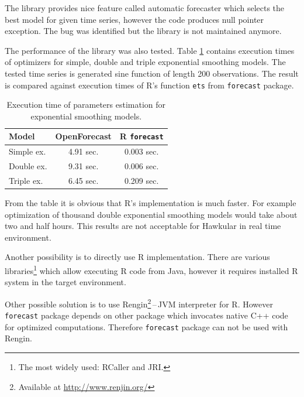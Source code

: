     The library provides nice feature called automatic forecaster which selects the best model for given
    time series, however the code produces null pointer exception. The bug was identified but the library is not
    maintained anymore.

    The performance of the library was also tested. Table \ref{tab:open-forecast-perf} contains execution times of
    optimizers for simple, double and triple exponential smoothing models. The tested time series is generated sine
    function of length 200 observations. The result is compared against execution times of R's function \texttt{ets}
    from \texttt{forecast} package.

    \begin{table}[h]
        \begin{center}
            \begin{tabular}{l|c|c}
                \textbf{Model} & \textbf{OpenForecast} & \textbf{R \texttt{forecast}} \\ \hline \hline
                Simple ex. & 4.91 sec. & 0.003 sec.\\
                Double ex. & 9.31 sec. & 0.006 sec.\\
                Triple ex. & 6.45 sec. & 0.209 sec.\\
            \end{tabular}
            \caption{Execution time of parameters estimation for exponential smoothing models.}
            \label{tab:open-forecast-perf}
        \end{center}
    \end{table}

    From the table it is obvious that R's implementation is much faster. For example optimization of thousand double
    exponential smoothing models would take about two and half hours. This results are not acceptable for Hawkular in
    real time environment.

    Another possibility is to directly use R implementation. There are various libraries\footnote{The most widely used:
    RCaller and JRI.} which allow executing R code from Java, however it requires installed R system in the target
    environment.

    Other possible solution is to use Rengin\footnote{Available at \url{http://www.renjin.org/}}\,--\,JVM interpreter
    for R. However \texttt{forecast} package depends on other package which invocates native C++ code for optimized
    computations. Therefore \texttt{forecast} package can not be used with Rengin.
